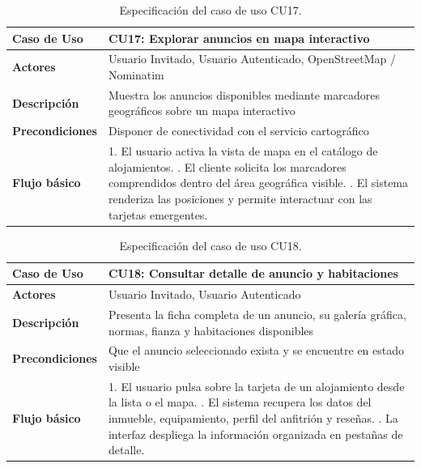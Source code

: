 \begin{table}[H]
\centering
\begin{tabular}{|p{3.1cm}|p{10.9cm}|}
\hline
\textbf{Caso de Uso} & \textbf{CU17: Explorar anuncios en mapa interactivo} \\ \hline
\textbf{Actores} & Usuario Invitado, Usuario Autenticado, OpenStreetMap / Nominatim \\ \hline
\textbf{Descripción} & Muestra los anuncios disponibles mediante marcadores geográficos sobre un mapa interactivo \\ \hline
\textbf{Precondiciones} & Disponer de conectividad con el servicio cartográfico \\ \hline
\textbf{Flujo básico} & 
1. El usuario activa la vista de mapa en el catálogo de alojamientos. \newline
2. El cliente solicita los marcadores comprendidos dentro del área geográfica visible. \newline
3. El sistema renderiza las posiciones y permite interactuar con las tarjetas emergentes. \\ \hline
\end{tabular}
\caption{Especificación del caso de uso CU17.}
\label{tab:cu17}
\end{table}

\begin{table}[H]
\centering
\begin{tabular}{|p{3.1cm}|p{10.9cm}|}
\hline
\textbf{Caso de Uso} & \textbf{CU18: Consultar detalle de anuncio y habitaciones} \\ \hline
\textbf{Actores} & Usuario Invitado, Usuario Autenticado \\ \hline
\textbf{Descripción} & Presenta la ficha completa de un anuncio, su galería gráfica, normas, fianza y habitaciones disponibles \\ \hline
\textbf{Precondiciones} & Que el anuncio seleccionado exista y se encuentre en estado visible \\ \hline
\textbf{Flujo básico} & 
1. El usuario pulsa sobre la tarjeta de un alojamiento desde la lista o el mapa. \newline
2. El sistema recupera los datos del inmueble, equipamiento, perfil del anfitrión y reseñas. \newline
3. La interfaz despliega la información organizada en pestañas de detalle. \\ \hline
\end{tabular}
\caption{Especificación del caso de uso CU18.}
\label{tab:cu18}
\end{table}

